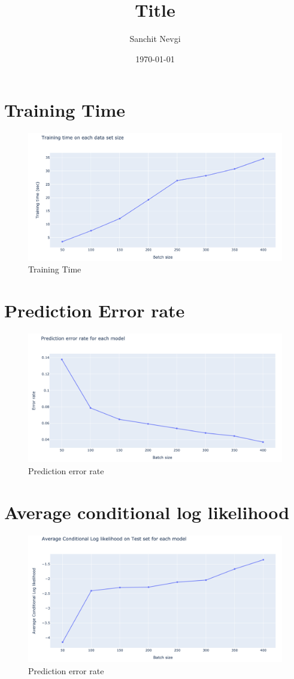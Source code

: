 \documentclass[11pt]{article}
\begin{document}
\title{\textbf{\huge{Title}}}

\date{\today}
\author{Sanchit Nevgi}

\section{Training Time}

\begin{figure}[H]
    \centering
    \includegraphics[width=\textwidth]{./images/a3_1.png}
    \caption{Training Time}
\end{figure}

\section{Prediction Error rate}

\begin{figure}[H]
    \centering
    \includegraphics[width=\textwidth]{./images/a3_2.png}
    \caption{Prediction error rate}
\end{figure}

\section{Average conditional log likelihood}

\begin{figure}[H]
    \centering
    \includegraphics[width=\textwidth]{./images/a3_3.png}
    \caption{Prediction error rate}
\end{figure}
\end{document}
